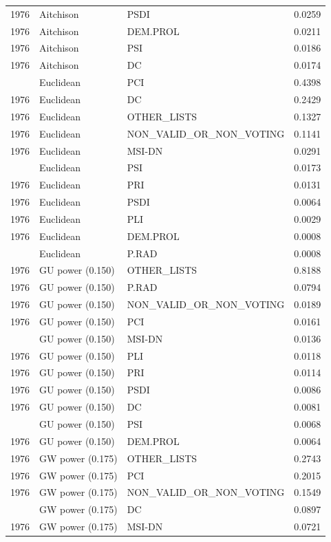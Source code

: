 \begin{longtable}[t]{rllr}
1976 & Aitchison & PSDI & 0.0259\\
1976 & Aitchison & DEM.PROL & 0.0211\\
1976 & Aitchison & PSI & 0.0186\\
1976 & Aitchison & DC & 0.0174\\
\addlinespace
1976 & Euclidean & PCI & 0.4398\\
1976 & Euclidean & DC & 0.2429\\
1976 & Euclidean & OTHER\_LISTS & 0.1327\\
1976 & Euclidean & NON\_VALID\_OR\_NON\_VOTING & 0.1141\\
1976 & Euclidean & MSI-DN & 0.0291\\
\addlinespace
1976 & Euclidean & PSI & 0.0173\\
1976 & Euclidean & PRI & 0.0131\\
1976 & Euclidean & PSDI & 0.0064\\
1976 & Euclidean & PLI & 0.0029\\
1976 & Euclidean & DEM.PROL & 0.0008\\
\addlinespace
1976 & Euclidean & P.RAD & 0.0008\\
1976 & GU power (0.150) & OTHER\_LISTS & 0.8188\\
1976 & GU power (0.150) & P.RAD & 0.0794\\
1976 & GU power (0.150) & NON\_VALID\_OR\_NON\_VOTING & 0.0189\\
1976 & GU power (0.150) & PCI & 0.0161\\
\addlinespace
1976 & GU power (0.150) & MSI-DN & 0.0136\\
1976 & GU power (0.150) & PLI & 0.0118\\
1976 & GU power (0.150) & PRI & 0.0114\\
1976 & GU power (0.150) & PSDI & 0.0086\\
1976 & GU power (0.150) & DC & 0.0081\\
\addlinespace
1976 & GU power (0.150) & PSI & 0.0068\\
1976 & GU power (0.150) & DEM.PROL & 0.0064\\
1976 & GW power (0.175) & OTHER\_LISTS & 0.2743\\
1976 & GW power (0.175) & PCI & 0.2015\\
1976 & GW power (0.175) & NON\_VALID\_OR\_NON\_VOTING & 0.1549\\
\addlinespace
1976 & GW power (0.175) & DC & 0.0897\\
1976 & GW power (0.175) & MSI-DN & 0.0721\\

\end{longtable}
